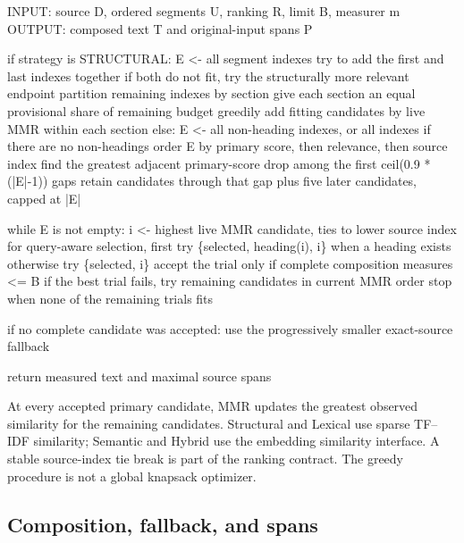 \documentclass[
]{article}
\newenvironment{Shaded}{}{}
\newcommand{\NormalTok}[1]{#1}
\newcounter{none} %
\begin{document}
\begin{Shaded}
\begin{Highlighting}[]
\NormalTok{INPUT: source D, ordered segments U, ranking R, limit B, measurer m}
\NormalTok{OUTPUT: composed text T and original{-}input spans P}

\NormalTok{if strategy is STRUCTURAL:}
\NormalTok{    E \textless{}{-} all segment indexes}
\NormalTok{    try to add the first and last indexes together}
\NormalTok{    if both do not fit, try the structurally more relevant endpoint}
\NormalTok{    partition remaining indexes by section}
\NormalTok{    give each section an equal provisional share of remaining budget}
\NormalTok{    greedily add fitting candidates by live MMR within each section}
\NormalTok{else:}
\NormalTok{    E \textless{}{-} all non{-}heading indexes, or all indexes if there are no non{-}headings}
\NormalTok{    order E by primary score, then relevance, then source index}
\NormalTok{    find the greatest adjacent primary{-}score drop among the first ceil(0.9 * (|E|{-}1)) gaps}
\NormalTok{    retain candidates through that gap plus five later candidates, capped at |E|}

\NormalTok{while E is not empty:}
\NormalTok{    i \textless{}{-} highest live MMR candidate, ties to lower source index}
\NormalTok{    for query{-}aware selection, first try \{selected, heading(i), i\} when a heading exists}
\NormalTok{    otherwise try \{selected, i\}}
\NormalTok{    accept the trial only if complete composition measures \textless{}= B}
\NormalTok{    if the best trial fails, try remaining candidates in current MMR order}
\NormalTok{    stop when none of the remaining trials fits}

\NormalTok{if no complete candidate was accepted:}
\NormalTok{    use the progressively smaller exact{-}source fallback}

\NormalTok{return measured text and maximal source spans}
\end{Highlighting}
\end{Shaded}

At every accepted primary candidate, MMR updates the greatest observed
similarity for the remaining candidates. Structural and Lexical use
sparse TF--IDF similarity; Semantic and Hybrid use the embedding
similarity interface. A stable source-index tie break is part of the
ranking contract. The greedy procedure is not a global knapsack
optimizer.

\subsection{Composition, fallback, and
spans}\label{composition-fallback-and-spans}
\end{document}
